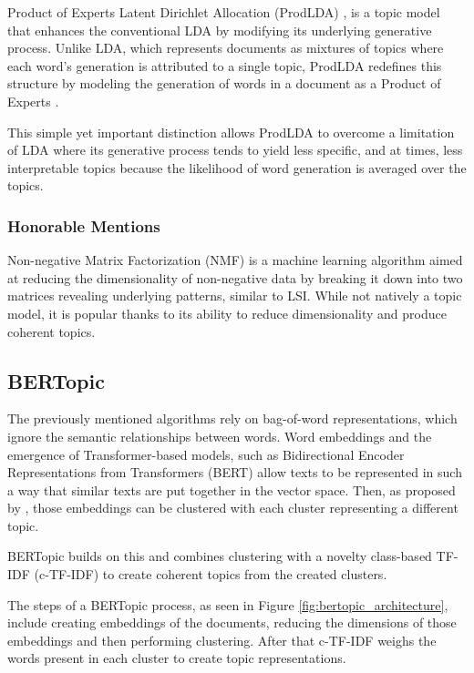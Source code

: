 Product of Experts Latent Dirichlet Allocation (ProdLDA) \citep{Srivastava;Sutton:17}, is a topic model that enhances the conventional LDA by modifying its underlying generative process. Unlike LDA, which represents documents as mixtures of topics where each word's generation is attributed to a single topic, ProdLDA redefines this structure by modeling the generation of words in a document as a Product of Experts \citep{hinton1999products}.

This simple yet important distinction allows ProdLDA to overcome a limitation of LDA where its generative process tends to yield less specific, and at times, less interpretable topics because the likelihood of word generation is averaged over the topics. 


\subsubsection{Honorable Mentions}

Non-negative Matrix Factorization (NMF) is a machine learning algorithm aimed at reducing the dimensionality of non-negative data by breaking it down into two matrices revealing underlying patterns, similar to LSI. While not natively a topic model, it is popular thanks to its ability to reduce dimensionality and produce coherent topics.

\subsection{BERTopic}
\label{sec:bertopic}

The previously mentioned algorithms rely on bag-of-word representations, which ignore the semantic relationships between words. Word embeddings and the emergence of Transformer-based models, such as Bidirectional Encoder Representations from Transformers (BERT) \citep{devlin2019bert} allow texts to be represented in such a way that similar texts are put together in the vector space. Then, as proposed by \citeauthor{sia-etal-2020-tired} \citeyearpar{sia-etal-2020-tired}, those embeddings can be clustered with each cluster representing a different topic.

BERTopic \citep{grootendorst2022bertopic} builds on this and combines clustering with a novelty class-based TF-IDF (c-TF-IDF) to create coherent topics from the created clusters. 

The steps of a BERTopic process, as seen in Figure \ref{fig:bertopic_architecture}, include creating embeddings of the documents, reducing the dimensions of those embeddings and then performing clustering. After that c-TF-IDF weighs the words present in each cluster to create topic representations.

